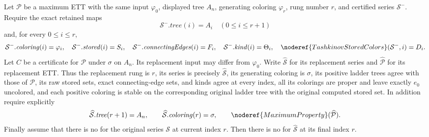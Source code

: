 \begin{helper}
Let $\mathcal P$ be a maximum ETT with the same input $\varphi_0$,
displayed tree $A_n$, generating coloring $\varphi_r$, rung number $r$,
and certified series $\mathcal S^-$.  Require the exact retained maps
\[
 \mathcal S^-.\mathit{tree}(i)=A_i\quad(0\leq i\leq r+1)
\]
and, for every $0\leq i\leq r$,
\[
 \mathcal S^-.\mathit{coloring}(i)=\varphi_i,\quad
 \mathcal S^-.\mathit{stored}(i)=S_i,\quad
 \mathcal S^-.\mathit{connectingEdges}(i)=F_i,\quad
 \mathcal S^-.\mathit{kind}(i)=\Theta_i,\quad
 \noderef{TashkinovStoredColors}(\mathcal S^-,i)=D_i.
\]
Let $C$ be a  certificate
for $\mathcal P$ under $\sigma$ on $A_n$.  Its replacement input may
differ from $\varphi_0$.  Write $\widehat{\mathcal S}$ for its replacement
series and $\widehat{\mathcal P}$ for its replacement ETT.  Thus the
replacement rung is $r$, its series is precisely
$\widehat{\mathcal S}$, its generating coloring is $\sigma$, its
positive ladder trees agree with those of $\mathcal P$, its raw stored
sets, exact connecting-edge sets, and kinds agree at every index, all
its colorings are proper and leave exactly $e_0$ uncolored, and each
positive coloring is stable on the corresponding original ladder tree
with the original computed stored set.  In addition require explicitly
\[
 \widehat{\mathcal S}.\mathit{tree}(r+1)=A_n,\qquad
 \widehat{\mathcal S}.\mathit{coloring}(r)=\sigma,
 \qquad \noderef{MaximumProperty}(\widehat{\mathcal P}).
\]
Finally assume that there is no
 for the original series
$\mathcal S$ at current index $r$.
Then there is no  for
$\widehat{\mathcal S}$ at its final index $r$.
\end{helper}
